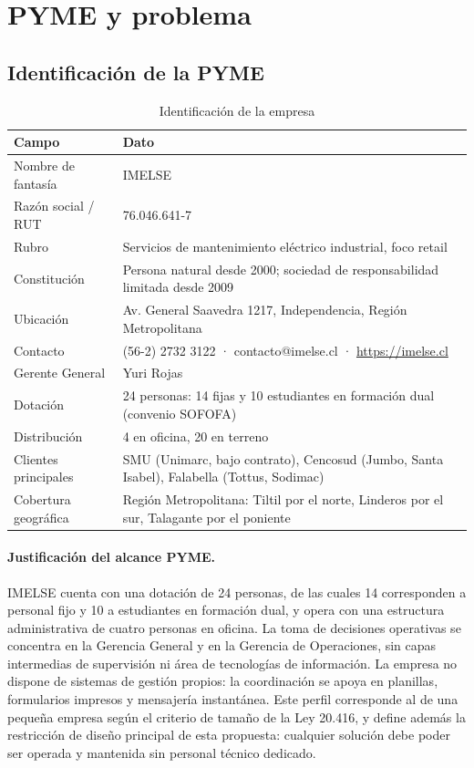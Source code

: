 \documentclass[10pt,letterpaper]{article}
\begin{document}
\section{PYME y problema}

\subsection{Identificación de la PYME}

\begin{table}[H]
\centering
\small
\begin{tabular}{@{}p{4.5cm}p{10cm}@{}}
\toprule
\textbf{Campo} & \textbf{Dato} \\
\midrule
Nombre de fantasía & IMELSE \\
Razón social / RUT & 76.046.641-7 \\
Rubro & Servicios de mantenimiento eléctrico industrial, foco retail \\
Constitución & Persona natural desde 2000; sociedad de responsabilidad limitada desde 2009 \\
Ubicación & Av. General Saavedra 1217, Independencia, Región Metropolitana \\
Contacto & (56-2) 2732 3122 · contacto@imelse.cl · \url{https://imelse.cl} \\
Gerente General & Yuri Rojas \\
Dotación & 24 personas: 14 fijas y 10 estudiantes en formación dual (convenio SOFOFA) \\
Distribución & 4 en oficina, 20 en terreno \\
Clientes principales & SMU (Unimarc, bajo contrato), Cencosud (Jumbo, Santa Isabel), Falabella (Tottus, Sodimac) \\
Cobertura geográfica & Región Metropolitana: Tiltil por el norte, Linderos por el sur, Talagante por el poniente \\
\bottomrule
\end{tabular}
\caption{Identificación de la empresa}
\end{table}

\paragraph{Justificación del alcance PYME.}
IMELSE cuenta con una dotación de 24 personas, de las cuales 14 corresponden a
personal fijo y 10 a estudiantes en formación dual, y opera con una estructura
administrativa de cuatro personas en oficina. La toma de decisiones operativas se
concentra en la Gerencia General y en la Gerencia de Operaciones, sin capas
intermedias de supervisión ni área de tecnologías de información. La empresa no
dispone de sistemas de gestión propios: la coordinación se apoya en planillas,
formularios impresos y mensajería instantánea. Este perfil corresponde al de una
pequeña empresa según el criterio de tamaño de la Ley 20.416, y define además la
restricción de diseño principal de esta propuesta: cualquier solución debe poder ser
operada y mantenida sin personal técnico dedicado.
\end{document}
